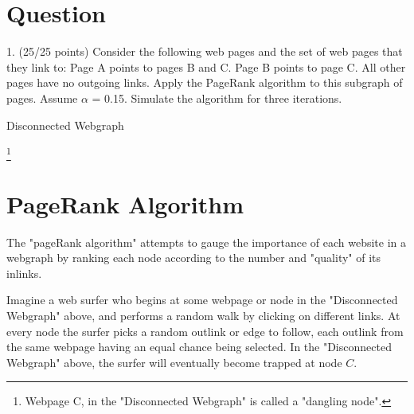 \documentclass[12pt]{article}
\begin{document}
\maketitle

\section{Question}
1.	(25/25 points) Consider the following web pages and the set of web pages that they link to:
Page A points to pages B and C.
Page B points to page C.
All other pages have no outgoing links.
Apply the PageRank algorithm to this subgraph of pages. Assume $\alpha$ = 0.15. Simulate the algorithm for three iterations. 


\begin{center}Disconnected Webgraph \end{center}

\begin{center}
     \footnote{Webpage C, in the "Disconnected Webgraph" is called a "dangling node".}
\end{center}

\section{PageRank Algorithm}

%
%
The "pageRank algorithm" attempts to gauge the importance of each website in a webgraph by ranking each node according to the number and "quality" of its inlinks.

Imagine a web surfer who begins at some webpage or node in the "Disconnected Webgraph" above, and performs a random walk by clicking on different links. At every node the surfer picks a random outlink or edge to follow, each outlink from the same webpage having an equal chance being selected. In the "Disconnected Webgraph" above, the surfer will eventually become trapped at node $C$. 
\end{document}
